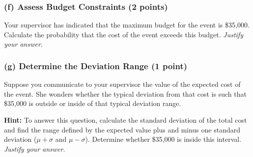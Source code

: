 \documentclass{article}
\begin{document}
\begin{center}
 \end{center}

\subsubsection*{(f) Assess Budget Constraints (2 points)}
Your supervisor has indicated that the maximum budget for the event is \$35,000. Calculate the probability that the cost of the event exceeds this budget. \emph{Justify your answer}.

\begin{center}
 \end{center}



\subsubsection*{(g) Determine the Deviation Range (1 point)}
Suppose you communicate to your supervisor the value of the expected cost of the event. She wonders whether the typical deviation from that cost is such that \$35,000 is outside or inside of that typical deviation range. 

\textbf{Hint:} To answer this question, calculate the standard deviation of the total cost and find the range defined by the expected value plus and minus one standard deviation ($\mu + \sigma$ and $\mu - \sigma$). Determine whether \$35,000 is inside this interval. \emph{Justify your answer}.

\begin{center}
 \end{center}
\end{document}
